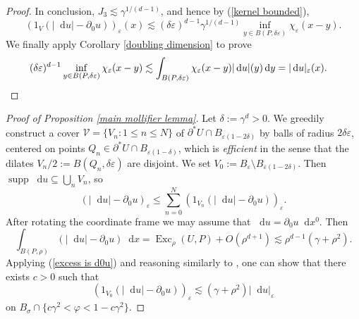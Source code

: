 \documentclass[reqno,11pt]{amsart}
\DeclareMathOperator{\Exc}{Exc}
\DeclareMathOperator{\supp}{supp}
\newcommand*\dif{\mathop{}\!\mathrm{d}}
\newcommand{\dfn}[1]{\emph{#1}\index{#1}}
\theoremstyle{definition}
\numberwithin{equation}{section}
\begin{document}
\begin{proof}
In conclusion, $J_3 \lesssim \gamma^{1/(d - 1)}$, and hence by (\ref{kernel bounded}),
$$(1_V(|\dif u| - \partial_0 u))_\varepsilon(x) \lesssim (\delta\varepsilon)^{d - 1} \gamma^{1/(d - 1)} \inf_{y \in B(P, \delta\varepsilon)} \chi_\varepsilon(x - y).$$
We finally apply Corollary \ref{doubling dimension} to prove
\begin{align*}
(\delta\varepsilon)^{d - 1} \inf_{y \in B(P, \delta\varepsilon)} \chi_\varepsilon(x - y)
&\lesssim \int_{B(P, \delta \varepsilon)} \chi_\varepsilon(x - y) |\dif u|(y) \dif y = |\dif u|_\varepsilon(x). \qedhere
\end{align*}
\end{proof}

\begin{proof}[Proof of Proposition \ref{main mollifier lemma}]
Let $\delta := \gamma^d > 0$.
We greedily construct a cover $\mathcal V = \{V_n: 1 \leq n \leq N\}$ of $\partial^* U \cap B_{\varepsilon(1 - 2\delta)}$ by balls of radius $2\delta\varepsilon$, centered on points $Q_n \in \partial^* U \cap B_{\varepsilon(1 - \delta)}$, which is \dfn{efficient} in the sense that the dilates $V_n/2 := B(Q_n, \delta\varepsilon)$ are disjoint.
We set $V_0 := B_\varepsilon \setminus B_{\varepsilon(1 - 2\delta)}$.
Then $\supp \dif u \subseteq \bigcup_n V_n$, so
\begin{equation}\label{sum over cover} 
(|\dif u| - \partial_0 u)_\varepsilon \leq \sum_{n = 0}^N (1_{V_n} (|\dif u| - \partial_0 u))_\varepsilon.
\end{equation}
After rotating the coordinate frame we may assume that $\dif u = \partial_0 u \dif x^0$. Then
\begin{equation}\label{excess is d0u}
    \int_{B(P, \rho)} (|\dif u| - \partial_0 u) \dif x = \Exc_\rho(U, P) + O(\rho^{d + 1}) \lesssim \rho^{d - 1}(\gamma + \rho^2).
\end{equation}
Applying (\ref{excess is d0u}) and reasoning similarly to \cite[pg92]{Giusti77}, one can show that there exists $c > 0$ such that
\begin{equation}\label{V0 case}
    (1_{V_0} (|\dif u| - \partial_0 u))_\varepsilon \lesssim (\gamma + \rho^2) |\dif u|_\varepsilon
\end{equation}
on $B_\sigma \cap \{c\gamma^2 < \varphi < 1 - c\gamma^2\}$.

\end{proof}
\end{document}
